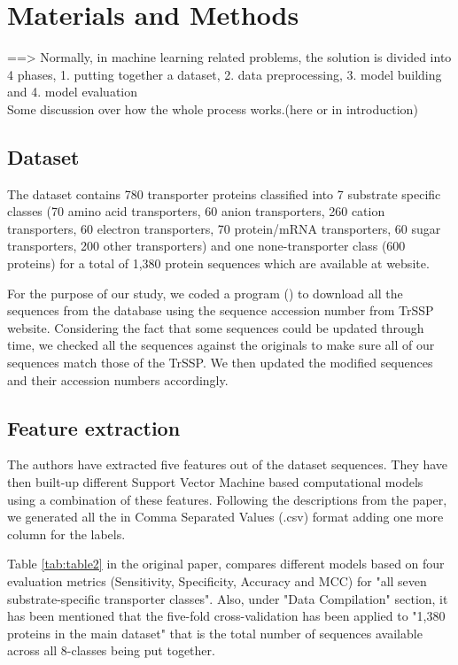 \section{Materials and Methods}
    ==> Normally, in machine learning related problems, the solution is divided into 4 phases, 1. putting 
        together a dataset, 2. data preprocessing, 3. model building and 4. model evaluation\\
        Some discussion over how the whole process works.(here or in introduction)\\

    \subsection{Dataset}

    The dataset contains 780 transporter proteins classified into 7 substrate specific classes (70 amino acid transporters, 
    60 anion transporters, 260 cation transporters, 60 electron transporters, 70 protein/mRNA transporters, 60 sugar 
    transporters, 200 other transporters) and one none-transporter class (600 proteins) for a total of 1,380 protein 
    sequences which are available at   website.
    
    For the purpose of our study, we coded a program () to download all the sequences from the 
     database using the sequence accession number from TrSSP website. 
    Considering the fact that some sequences could be updated through time, we checked all the  
    sequences against the originals to make sure all of our sequences match those of the TrSSP. We then updated the 
    modified sequences and their accession numbers accordingly.

    \subsection{Feature extraction}

    The authors \cite{mishra2014prediction} have extracted five features out of the dataset sequences. They have then built-up different Support Vector Machine based 
    computational models using a combination of these features. Following the descriptions from the paper, we generated all the 
     in Comma Separated Values (.csv) format adding one more column for the labels.

    Table \ref{tab:table2} in the original paper, compares different models based on four evaluation metrics (Sensitivity, Specificity, Accuracy and MCC) for 
    "all seven substrate-specific transporter classes". Also, under "Data Compilation" section, it has been mentioned that the five-fold 
    cross-validation has been applied to "1,380 proteins in the main dataset" that is the total number of sequences available across 
    all 8-classes being put together.

